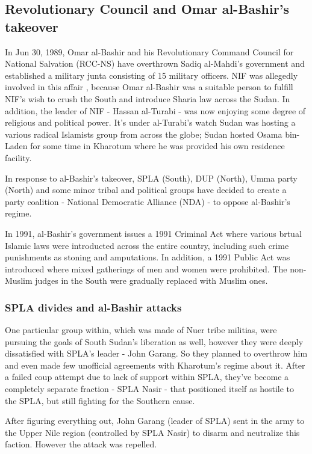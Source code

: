 \documentclass[14pt,a4paper]{article}
\begin{document}
\subsection{Revolutionary Council and Omar al-Bashir's takeover}

In Jun 30, 1989, Omar al-Bashir and his Revolutionary Command Council for National Salvation (RCC-NS) have overthrown Sadiq al-Mahdi's government and established a military junta consisting of 15 military officers. NIF was allegedly involved in this affair \cite{globalsecurity}, because Omar al-Bashir was a suitable person to fulfill NIF's wish to crush the South and introduce Sharia law across the Sudan. In addition, the leader of NIF - Hassan al-Turabi - was now enjoying some degree of religious and political power. It's under al-Turabi's watch Sudan was hosting a various radical Islamists group from across the globe; Sudan hosted Osama bin-Laden for some time in Kharotum where he was provided his own residence facility. 

In response to al-Bashir's takeover, SPLA (South), DUP (North), Umma party (North) and some minor tribal and political groups have decided to create a party coalition - National Democratic Alliance (NDA) - to oppose al-Bashir's regime. 

In 1991, al-Bashir's government issues a 1991 Criminal Act where various brtual Islamic laws were introducted across the entire country, including such crime punishments as stoning and amputations. In addition, a 1991 Public Act was introduced where mixed gatherings of men and women were prohibited. The non-Muslim judges in the South were gradually replaced with Muslim ones.

\subsubsection{SPLA divides and al-Bashir attacks}

One particular group within, which was made of Nuer tribe militias, were pursuing the goals of South Sudan's liberation as well, however they were deeply dissatisfied with SPLA's leader - John Garang. So they planned to overthrow him and even made few unofficial agreements with Kharotum's regime about it. After a failed coup attempt due to lack of support within SPLA, they've become a completely separate fraction - SPLA Nasir - that positioned itself as hostile to the SPLA, but still fighting for the Southern cause. 

After figuring everything out, John Garang (leader of SPLA) sent in the army to the Upper Nile region (controlled by SPLA Nasir) to disarm and neutralize this faction. However the attack was repelled. 
\end{document}

